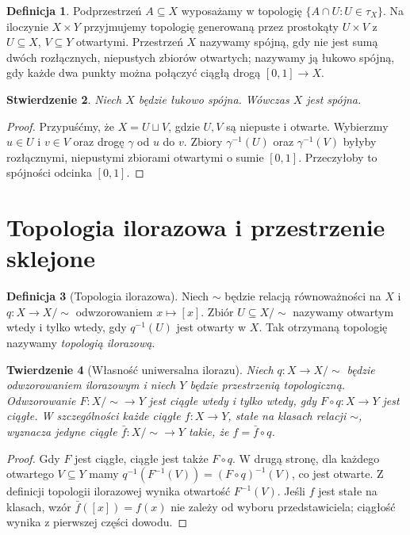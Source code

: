 \documentclass[11pt,a4paper,oneside]{report}
\theoremstyle{plain}
\newtheorem{twierdzenie}{Twierdzenie}[section]
\newtheorem{stwierdzenie}[twierdzenie]{Stwierdzenie}
\theoremstyle{definition}
\newtheorem{definicja}[twierdzenie]{Definicja}
\theoremstyle{remark}
\begin{document}
\begin{definicja}
Podprzestrzeń $A\subseteq X$ wyposażamy w topologię $\{A\cap U:U\in\tau_X\}$.
Na iloczynie $X\times Y$ przyjmujemy topologię generowaną przez prostokąty
$U\times V$ z $U\subseteq X$, $V\subseteq Y$ otwartymi. Przestrzeń $X$
nazywamy spójną, gdy nie jest sumą dwóch rozłącznych, niepustych zbiorów
otwartych; nazywamy ją łukowo spójną, gdy każde dwa punkty można połączyć
ciągłą drogą $[0,1]\to X$.
\end{definicja}

\begin{stwierdzenie}
Niech $X$ będzie łukowo spójna. Wówczas $X$ jest spójna.
\end{stwierdzenie}
\begin{proof}
Przypuśćmy, że $X=U\sqcup V$, gdzie $U,V$ są niepuste i otwarte.
Wybierzmy $u\in U$ i $v\in V$ oraz drogę $\gamma$ od $u$ do $v$.
Zbiory $\gamma^{-1}(U)$ oraz $\gamma^{-1}(V)$ byłyby rozłącznymi,
niepustymi zbiorami otwartymi o sumie $[0,1]$. Przeczyłoby to spójności
odcinka $[0,1]$.
\end{proof}

\section{Topologia ilorazowa i przestrzenie sklejone}

\begin{definicja}[Topologia ilorazowa]
\label{def:topologia-ilorazowa}
Niech $\sim$ będzie relacją równoważności na $X$ i
$q:X\to X/{\sim}$ odwzorowaniem $x\mapsto[x]$.
Zbiór $U\subseteq X/{\sim}$ nazywamy otwartym wtedy i tylko wtedy, gdy
$q^{-1}(U)$ jest otwarty w $X$. Tak otrzymaną topologię nazywamy
\emph{topologią ilorazową}.
\end{definicja}

\begin{twierdzenie}[Własność uniwersalna ilorazu]
Niech $q:X\to X/{\sim}$ będzie odwzorowaniem ilorazowym i niech $Y$ będzie
przestrzenią topologiczną. Odwzorowanie $F:X/{\sim}\to Y$ jest ciągłe wtedy
i tylko wtedy, gdy $F\circ q:X\to Y$ jest ciągłe.
W szczególności każde ciągłe $f:X\to Y$, stałe na klasach relacji $\sim$,
wyznacza jedyne ciągłe $\bar f:X/{\sim}\to Y$ takie, że $f=\bar f\circ q$.
\end{twierdzenie}
\begin{proof}
Gdy $F$ jest ciągłe, ciągłe jest także $F\circ q$. W drugą stronę,
dla każdego otwartego $V\subseteq Y$ mamy
$q^{-1}(F^{-1}(V))=(F\circ q)^{-1}(V)$, co jest otwarte.
Z definicji topologii ilorazowej wynika otwartość $F^{-1}(V)$.
Jeśli $f$ jest stałe na klasach, wzór $\bar f([x])=f(x)$ nie zależy od wyboru
przedstawiciela; ciągłość wynika z pierwszej części dowodu.
\end{proof}
\end{document}
